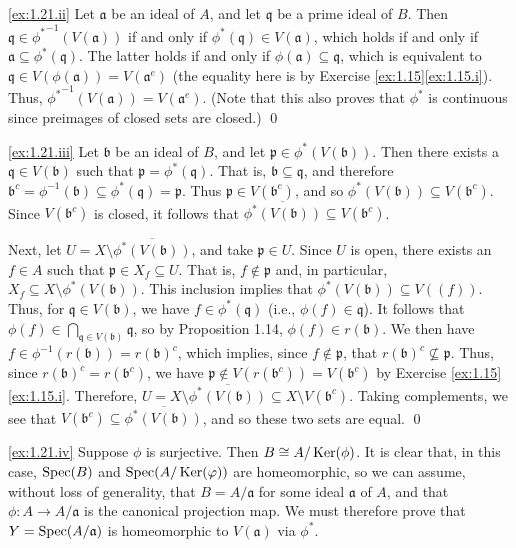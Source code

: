 \noindent
\ref{ex:1.21.ii}
Let $\mathfrak a$ be an ideal of $A$, and let $\mathfrak q$ be a prime ideal of $B$.
Then $\mathfrak q \in {\phi^*}^{-1}(V(\mathfrak a))$ if and only if $\phi^*(\mathfrak q) \in V(\mathfrak a)$, which holds if and only if $\mathfrak a \subseteq \phi^*(\mathfrak q)$.
The latter holds if and only if $\phi(\mathfrak a) \subseteq \mathfrak q$, which is equivalent to $\mathfrak q \in V(\phi(\mathfrak a)) = V(\mathfrak a^e)$ (the equality here is by Exercise \ref{ex:1.15}\ref{ex:1.15.i}).
Thus, ${\phi^*}^{-1}(V(\mathfrak a)) = V(\mathfrak a^e)$.
(Note that this also proves that $\phi^*$ is continuous since preimages of closed sets are closed.)
\qed


\noindent
\ref{ex:1.21.iii}
Let $\mathfrak b$ be an ideal of $B$, and let $\mathfrak p \in \phi^*(V(\mathfrak b))$.
Then there exists a $\mathfrak q \in V(\mathfrak b)$ such that $\mathfrak p = \phi^*(\mathfrak q)$.
That is, $\mathfrak b \subseteq \mathfrak q$, and therefore $\mathfrak b^c = \phi^{-1}(\mathfrak b) \subseteq \phi^*(\mathfrak q) = \mathfrak p$.
Thus $\mathfrak p \in V(\mathfrak b^c)$, and so $\phi^*(V(\mathfrak b)) \subseteq V(\mathfrak b^c)$.
Since $V(\mathfrak b^c)$ is closed, it follows that $\overline{\phi^*(V(\mathfrak b))} \subseteq V(\mathfrak b^c)$.

Next, let $U = X \setminus \overline{\phi^*(V(\mathfrak b))}$, and take $\mathfrak p \in U$.
Since $U$ is open, there exists an $f \in A$ such that $\mathfrak p \in X_f \subseteq U$.
That is, $f \notin \mathfrak p$ and, in particular, $X_f \subseteq X\setminus \phi^*(V(\mathfrak b))$.
This inclusion implies that $\phi^*(V(\mathfrak b)) \subseteq V((f))$.
Thus, for $\mathfrak q \in V(\mathfrak b)$, we have $f \in \phi^*(\mathfrak q)$ (i.e., $\phi(f) \in \mathfrak q$).
It follows that $\phi(f) \in \bigcap_{\mathfrak q \in V(\mathfrak b)} \mathfrak q$, so by Proposition 1.14, $\phi(f) \in r(\mathfrak b)$.
We then have $f \in \phi^{-1}(r(\mathfrak b)) = r(\mathfrak b)^c$, which implies, since $f \notin \mathfrak p$, that $r(\mathfrak b)^c \not\subseteq \mathfrak p$.
Thus, since $r(\mathfrak b)^c = r(\mathfrak b^c)$, we have $\mathfrak p \notin V(r(\mathfrak b^c)) = V(\mathfrak b^c)$ by Exercise \ref{ex:1.15}\ref{ex:1.15.i}.
Therefore, $U = X \setminus \overline{\phi^*(V(\mathfrak b))} \subseteq X\setminus V(\mathfrak b^c)$.
Taking complements, we see that $V(\mathfrak b^c) \subseteq \overline{\phi^*(V(\mathfrak b))}$, and so these two sets are equal.
\qed

\noindent
\ref{ex:1.21.iv}
Suppose $\phi$ is surjective.
Then $B \cong A/\operatorname{Ker}(\phi)$.
It is clear that, in this case, $\operatorname{Spec}(B)$ and $\operatorname{Spec}(A/\operatorname{Ker}(\varphi))$ are homeomorphic, so we can assume, without loss of generality, that $B = A/\mathfrak a$ for some ideal $\mathfrak a$ of $A$, and that $\phi : A \to A/\mathfrak a$ is the canonical projection map.
We must therefore prove that $Y = \operatorname{Spec}(A/\mathfrak a)$ is homeomorphic to $V(\mathfrak a)$ via $\phi^*$.


